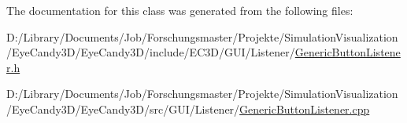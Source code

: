 The documentation for this class was generated from the following files\+:\begin{DoxyCompactItemize}
\item 
D\+:/\+Library/\+Documents/\+Job/\+Forschungsmaster/\+Projekte/\+Simulation\+Visualization/\+Eye\+Candy3\+D/\+Eye\+Candy3\+D/include/\+E\+C3\+D/\+G\+U\+I/\+Listener/\mbox{\hyperlink{_generic_button_listener_8h}{Generic\+Button\+Listener.\+h}}\item 
D\+:/\+Library/\+Documents/\+Job/\+Forschungsmaster/\+Projekte/\+Simulation\+Visualization/\+Eye\+Candy3\+D/\+Eye\+Candy3\+D/src/\+G\+U\+I/\+Listener/\mbox{\hyperlink{_generic_button_listener_8cpp}{Generic\+Button\+Listener.\+cpp}}\end{DoxyCompactItemize}
